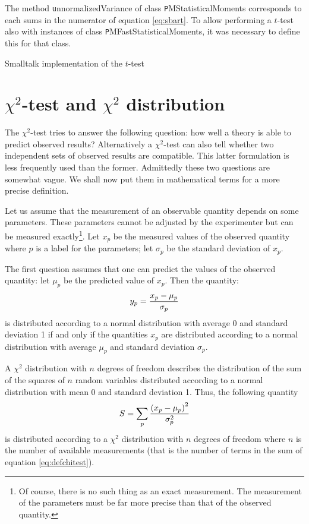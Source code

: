 The method {\texttt unnormalizedVariance} of class {\texttt
PMStatisticalMoments} corresponds to each sums in the numerator
of equation \ref{eq:sbart}. To allow performing a $t$-test also
with instances of class {\texttt PMFastStatisticalMoments}, it was
necessary to define this for that class.

\begin{listing} Smalltalk implementation of the $t$-test \label{ls:tTest}



\end{listing}

\section{$\chi^2$-test and $\chi^2$ distribution}
\label{sec:chitest} The $\chi^2$-test tries to answer the
following question: how well a theory is able to predict observed
results? Alternatively a $\chi^2$-test can also tell whether two
independent sets of observed results are compatible. This latter
formulation is less frequently used than the former. Admittedly
these two questions are somewhat vague. We shall now put them in
mathematical terms for a more precise definition.

Let us assume that the measurement of an observable quantity
depends on some parameters. These parameters cannot be adjusted by
the experimenter but can be measured exactly\footnote{Of course,
there is no such thing as an exact measurement. The measurement of
the parameters must be far more precise than that of the observed
quantity.}. Let $x_p$ be the measured values of the observed
quantity where $p$ is a label for the parameters; let $\sigma_p$
be the standard deviation of $x_p$.

The first question assumes that one can predict the values of the
observed quantity: let $\mu_p$ be the predicted value of $x_p$.
Then the quantity:
\begin{equation}
  y_p = { x_p - \mu_p \over \sigma_p}
\end{equation}
is distributed according to a normal distribution with average 0
and standard deviation 1 if and only if the quantities $x_p$ are
distributed according to a normal distribution with average
$\mu_p$ and standard deviation $\sigma_p$.

A $\chi^2$ distribution with $n$ degrees of freedom describes the
distribution of the sum of the squares of $n$ random variables
distributed according to a normal distribution with mean 0 and
standard deviation 1. Thus, the following quantity
\begin{equation}
\label{eq:defchitest}
  S=\sum_p { \left(x_p - \mu_p\right)^2\over \sigma_p^2}
\end{equation}
is distributed according to a $\chi^2$ distribution with $n$
degrees of freedom where $n$ is the number of available
measurements (that is the number of terms in the sum of equation
\ref{eq:defchitest}).

